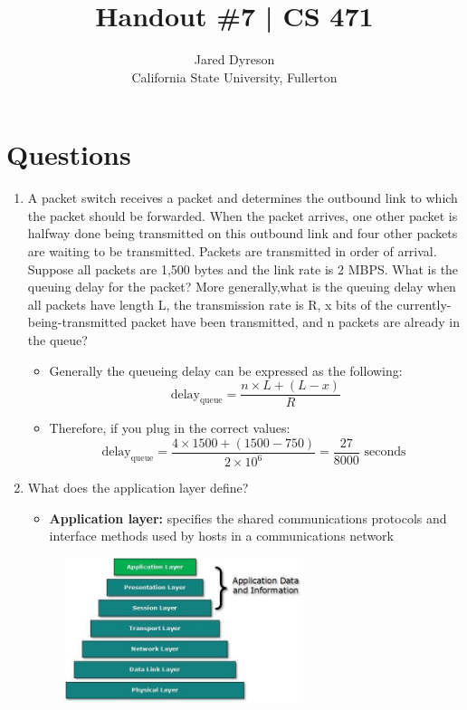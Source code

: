 \documentclass{article}
\title{Handout \#7 | CS 471}
\author{Jared Dyreson\\ 
        California State University, Fullerton}
\begin{document}
\maketitle
\tableofcontents

\newpage

\section{Questions}

\begin{enumerate}
\item A  packet switch receives a  packet and determines the  outbound link to which the packet should be forwarded. When the packet arrives, one other packet is halfway done being transmitted  on this outbound link  and four other packets are waiting  to be transmitted. Packets are transmitted in order  of arrival. Suppose all packets are 1,500 bytes and the link  rate is 2 MBPS.  What  is the queuing delay  for the  packet? More generally,what  is the  queuing delay when all packets have length L,  the transmission rate  is R, x  bits  of the currently- being-transmitted packet have been transmitted,  and n packets are already in  the queue?
\begin{itemize}
\item Generally the queueing delay can be expressed as the following: \\
$$\text{delay}_{\text{queue}} = \frac{n \times L + (L - x)}{R}$$
\item Therefore, if you plug in the correct values: \\
$$\text{delay}_{\text{queue}} = \frac{4 \times 1500 + (1500 - 750)}{2 \times 10^{6}} = \frac{27}{8000} \text{ seconds } $$
\end{itemize}
\item What does the application layer define?
\begin{itemize}
\item \textbf{Application layer:} specifies the shared communications protocols and interface methods used by hosts in a communications network
\end{itemize}
\begin{figure}[!h]
\centering
\includegraphics[width=7cm]{application_layer}

\end{figure}
\end{enumerate}
\end{document}
